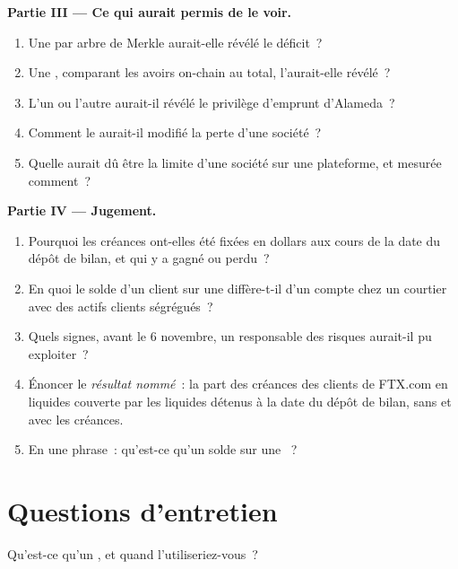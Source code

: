 \begin{problem}
\medskip\noindent\textbf{Partie III --- Ce qui aurait permis de le voir.}
\begin{enumerate}[resume]
\item Une  par arbre de Merkle aurait-elle révélé le déficit~?
\item Une , comparant les avoirs on-chain au total, l'aurait-elle révélé~?
\item L'un ou l'autre aurait-il révélé le privilège d'emprunt d'Alameda~?
\item Comment le  aurait-il modifié la perte d'une société~?
\item Quelle aurait dû être la limite d'une société sur une plateforme, et mesurée comment~?
\end{enumerate}

\medskip\noindent\textbf{Partie IV --- Jugement.}
\begin{enumerate}[resume]
\item Pourquoi les créances ont-elles été fixées en dollars aux cours de la date du dépôt de bilan, et qui y a gagné ou perdu~?
\item En quoi le solde d'un client sur une  diffère-t-il d'un compte chez un courtier
avec des actifs clients ségrégués~?
\item Quels signes, avant le 6 novembre, un responsable des risques aurait-il pu exploiter~?
\item Énoncer le \emph{résultat nommé}~: la part des créances des clients de FTX.com en  liquides couverte par les
 liquides détenus à la date du dépôt de bilan, sans et avec les créances.
\item En une phrase~: qu'est-ce qu'un solde sur une ~?
\end{enumerate}
\end{problem}

\section{Questions d'entretien}

\begin{interviewq}\label{iq:m3:centralised-exchanges:1}
Qu'est-ce qu'un , et quand l'utiliseriez-vous~?
\end{interviewq}

